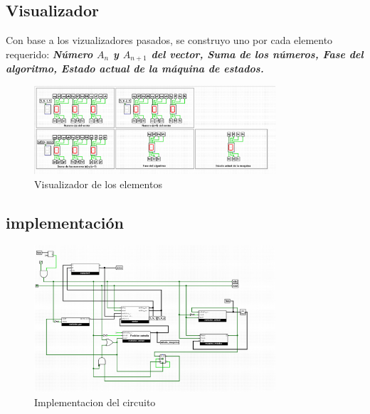 \documentclass{article}
\begin{document}
\subsection{Visualizador}
Con base a los vizualizadores pasados, se construyo uno por cada elemento requerido: 
\textbf{\textit{Número $A_n$ y $A_{n+1}$ del vector, Suma de los números, Fase del algoritmo, Estado actual de la máquina de estados.}}
\newpage
\begin{figure}[h] %
    \centering
    \includegraphics[width=0.8\textwidth]{imagenes/visualizador.png} %
    \caption{Visualizador de los elementos} %
    \label{fig:Visualizador} %
\end{figure}
\subsection{implementación}
\begin{figure}[h] %
    \centering
    \includegraphics[width=0.8\textwidth]{imagenes/circuito_full.png} %
    \caption{Implementacion del circuito} %
    \label{fig:circuitofull} %
\end{figure}
\end{document}

